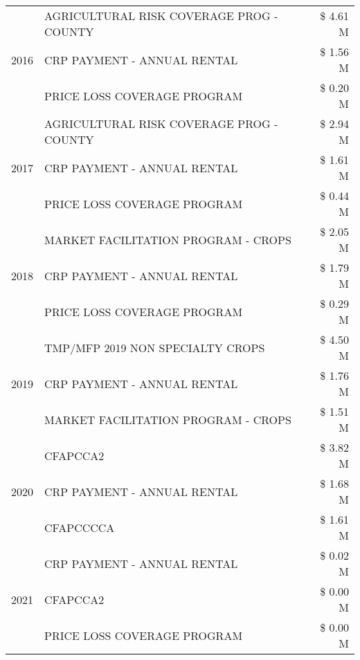 \begin{tabular}{llr}
\multirow[t]{3}{*}{2016} & AGRICULTURAL RISK COVERAGE PROG - COUNTY & \$ 4.61 M \\
 & CRP PAYMENT - ANNUAL RENTAL & \$ 1.56 M \\
 & PRICE LOSS COVERAGE PROGRAM & \$ 0.20 M \\
\cline{1-3}
\multirow[t]{3}{*}{2017} & AGRICULTURAL RISK COVERAGE PROG - COUNTY & \$ 2.94 M \\
 & CRP PAYMENT - ANNUAL RENTAL & \$ 1.61 M \\
 & PRICE LOSS COVERAGE PROGRAM & \$ 0.44 M \\
\cline{1-3}
\multirow[t]{3}{*}{2018} & MARKET FACILITATION PROGRAM - CROPS & \$ 2.05 M \\
 & CRP PAYMENT - ANNUAL RENTAL & \$ 1.79 M \\
 & PRICE LOSS COVERAGE PROGRAM & \$ 0.29 M \\
\cline{1-3}
\multirow[t]{3}{*}{2019} & TMP/MFP 2019 NON SPECIALTY CROPS & \$ 4.50 M \\
 & CRP PAYMENT - ANNUAL RENTAL & \$ 1.76 M \\
 & MARKET FACILITATION PROGRAM - CROPS & \$ 1.51 M \\
\cline{1-3}
\multirow[t]{3}{*}{2020} & CFAPCCA2 & \$ 3.82 M \\
 & CRP PAYMENT - ANNUAL RENTAL & \$ 1.68 M \\
 & CFAPCCCCA & \$ 1.61 M \\
\cline{1-3}
\multirow[t]{3}{*}{2021} & CRP PAYMENT - ANNUAL RENTAL & \$ 0.02 M \\
 & CFAPCCA2 & \$ 0.00 M \\
 & PRICE LOSS COVERAGE PROGRAM & \$ 0.00 M \\
\cline{1-3}
\bottomrule
\end{tabular}

